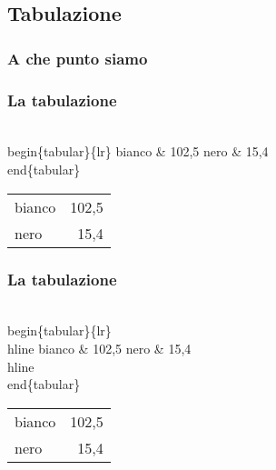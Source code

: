 \documentclass[svgnames,%
	ucs,%
	pdftex]{guitbeamer}
\begin{document}
\subsection{Tabulazione}
\begin{frame}
  \frametitle{A che punto siamo}
\end{frame}
\begin{frame}
  \frametitle{La tabulazione}
	\begin{LaTeXcode}
		\\begin\{tabular\}\{\alert{lr}\}\n
		\hspace*{5ex}bianco \alert{\&} 102,5 \alert{\bs\bs}\n
		\hspace*{5ex}nero   \alert{\&} 15,4 \alert{\bs\bs}\n
		\\end\{tabular\}
	\end{LaTeXcode}
	\begin{LaTeXoutput}
		\begin{tabular}{l r}
		bianco & 102,5 \\
		nero   & 15,4 \\
		\end{tabular}
	\end{LaTeXoutput}
\end{frame}
\begin{frame}
  \frametitle{La tabulazione}
	\begin{LaTeXcode}
		\\begin\{tabular\}\{lr\}\
		\alert{\\hline}\n
		\hspace*{5ex}bianco \& 102,5 \bs\bs\n
		\hspace*{5ex}nero   \& 15,4 \bs\bs\
		\alert{\\hline}\n
		\\end\{tabular\}
	\end{LaTeXcode}
	\begin{LaTeXoutput}
		\begin{tabular}{l r}
		\hline
		bianco & 102,5 \\
		nero   & 15,4 \\
		\hline
		\end{tabular}
	\end{LaTeXoutput}
\end{frame}
\end{document}
